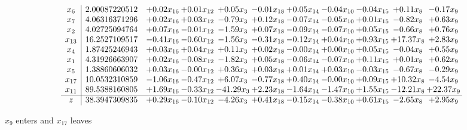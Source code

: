 \documentclass[9pt]{article}
\begin{document}
 \[\begin{array}{c| c c@{\hskip 2pt} c@{\hskip 2pt} c@{\hskip 2pt} c@{\hskip 2pt} c@{\hskip 2pt} c@{\hskip 2pt} c@{\hskip 2pt} c@{\hskip 2pt} c@{\hskip 2pt} }
 x_{6}   &  2.00087220512 & +  0.02 x_{16} & +  0.01 x_{12} & +  0.05 x_{3} & -0.01 x_{18} & +  0.05 x_{14} & -0.04 x_{10} & -0.04 x_{15} & +  0.11 x_{8} & -0.17 x_{9}\\
 x_{7}   &  4.06316371296 & +  0.02 x_{16} & +  0.03 x_{12} & -0.79 x_{3} & +  0.12 x_{18} & -0.07 x_{14} & -0.05 x_{10} & +  0.01 x_{15} & -0.82 x_{8} & +  0.63 x_{9}\\
 x_{2}   &  4.02725094764 & +  0.07 x_{16} & -0.01 x_{12} & -1.59 x_{3} & +  0.07 x_{18} & -0.09 x_{14} & -0.07 x_{10} & +  0.05 x_{15} & -0.66 x_{8} & +  0.76 x_{9}\\
 x_{13}   &  16.2527109517 & -0.41 x_{16} & -0.60 x_{12} & -1.56 x_{3} & -0.31 x_{18} & -0.12 x_{14} & +  0.04 x_{10} & +  0.93 x_{15} & + 17.37 x_{8} & +  2.83 x_{9}\\
 x_{4}   &  1.87425246943 & +  0.03 x_{16} & +  0.04 x_{12} & +  0.11 x_{3} & +  0.02 x_{18} & -0.00 x_{14} & +  0.00 x_{10} & +  0.05 x_{15} & -0.04 x_{8} & +  0.55 x_{9}\\
 x_{1}   &  4.31926663907 & +  0.02 x_{16} & -0.08 x_{12} & -1.82 x_{3} & +  0.05 x_{18} & -0.06 x_{14} & -0.07 x_{10} & +  0.11 x_{15} & +  0.01 x_{8} & +  0.62 x_{9}\\
 x_{5}   &  1.38860606032 & +  0.03 x_{16} & -0.00 x_{12} & +  0.36 x_{3} & +  0.03 x_{18} & +  0.01 x_{14} & +  0.03 x_{10} & -0.03 x_{15} & -0.67 x_{8} & -0.29 x_{9}\\
 x_{17}   &  10.0532310859 & -1.06 x_{16} & -0.47 x_{12} & +  6.07 x_{3} & -0.77 x_{18} & +  0.40 x_{14} & -0.00 x_{10} & +  0.09 x_{15} & + 10.32 x_{8} & -4.54 x_{9}\\
 x_{11}   &  89.5388160805 & +  1.69 x_{16} & -0.33 x_{12} & -41.29 x_{3} & +  2.23 x_{18} & -1.64 x_{14} & -1.47 x_{10} & +  1.55 x_{15} & -12.21 x_{8} & + 22.37 x_{9}\\
\hline
z    &  38.3947309835 & +  0.29 x_{16} & -0.10 x_{12} & -4.26 x_{3} & +  0.41 x_{18} & -0.15 x_{14} & -0.38 x_{10} & +  0.61 x_{15} & -2.65 x_{8} & +  2.95 x_{9}\\
\end{array}\]


 $ x_{9} $ enters and $ x_{17} $ leaves 
\end{document}
